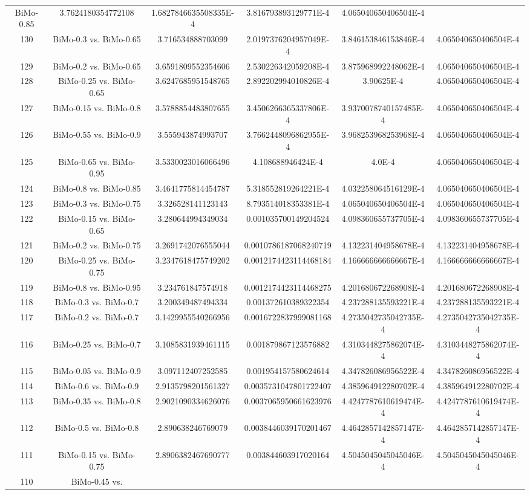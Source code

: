 \documentclass[a4paper,10pt]{article}
\begin{document}
\begin{landscape}
\begin{table}[!htp]
\begin{tabular}{cccccc}
BiMo-0.85&3.7624180354772108&1.6827846635508335E-4&3.816793893129771E-4&4.065040650406504E-4\\130&BiMo-0.3 vs. BiMo-0.65&3.716534888703099&2.0197376204957049E-4&3.846153846153846E-4&4.065040650406504E-4\\129&BiMo-0.2 vs. BiMo-0.65&3.6591809552354606&2.530226342059208E-4&3.875968992248062E-4&4.065040650406504E-4\\128&BiMo-0.25 vs. BiMo-0.65&3.6247685951548765&2.892202994010826E-4&3.90625E-4&4.065040650406504E-4\\127&BiMo-0.15 vs. BiMo-0.8&3.5788854483807655&3.4506266365337806E-4&3.9370078740157485E-4&4.065040650406504E-4\\126&BiMo-0.55 vs. BiMo-0.9&3.555943874993707&3.7662448096862955E-4&3.968253968253968E-4&4.065040650406504E-4\\125&BiMo-0.65 vs. BiMo-0.95&3.5330023016066496&4.108688946424E-4&4.0E-4&4.065040650406504E-4\\124&BiMo-0.8 vs. BiMo-0.85&3.4641775814454787&5.318552819264221E-4&4.032258064516129E-4&4.065040650406504E-4\\123&BiMo-0.3 vs. BiMo-0.75&3.326528141123143&8.793514018353381E-4&4.065040650406504E-4&4.065040650406504E-4\\122&BiMo-0.15 vs. BiMo-0.65&3.280644994349034&0.001035700149204524&4.098360655737705E-4&4.098360655737705E-4\\121&BiMo-0.2 vs. BiMo-0.75&3.2691742076555044&0.0010786187068240719&4.132231404958678E-4&4.132231404958678E-4\\120&BiMo-0.25 vs. BiMo-0.75&3.2347618475749202&0.0012174423114468184&4.166666666666667E-4&4.166666666666667E-4\\119&BiMo-0.8 vs. BiMo-0.95&3.234761847574918&0.0012174423114468275&4.201680672268908E-4&4.201680672268908E-4\\118&BiMo-0.3 vs. BiMo-0.7&3.200349487494334&0.001372610389322354&4.237288135593221E-4&4.237288135593221E-4\\117&BiMo-0.2 vs. BiMo-0.7&3.1429955540266956&0.0016722837999081168&4.2735042735042735E-4&4.2735042735042735E-4\\116&BiMo-0.25 vs. BiMo-0.7&3.1085831939461115&0.001879867123576882&4.3103448275862074E-4&4.3103448275862074E-4\\115&BiMo-0.05 vs. BiMo-0.9&3.097112407252585&0.001954157580624614&4.347826086956522E-4&4.347826086956522E-4\\114&BiMo-0.6 vs. BiMo-0.9&2.9135798201561327&0.0035731047801722407&4.385964912280702E-4&4.385964912280702E-4\\113&BiMo-0.35 vs. BiMo-0.8&2.9021090334626076&0.0037065950661623976&4.4247787610619474E-4&4.4247787610619474E-4\\112&BiMo-0.5 vs. BiMo-0.8&2.890638246769079&0.0038446039170201467&4.4642857142857147E-4&4.4642857142857147E-4\\111&BiMo-0.15 vs. BiMo-0.75&2.8906382467690777&0.003844603917020164&4.5045045045045046E-4&4.5045045045045046E-4\\110&BiMo-0.45 vs. 
\end{tabular}
\end{table}
\end{landscape}
\end{document}

